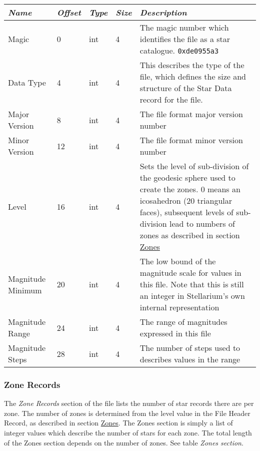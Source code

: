 \begin{longtabu} to \textwidth {l l l l X}\toprule
\emph{Name} & \emph{Offset} & \emph{Type} & \emph{Size} & \emph{Description}\\\midrule
Magic             &  0 & int & 4 & The magic number which identifies the file as a star catalogue. \texttt{0xde0955a3}\\\midrule
Data Type         &  4 & int & 4 & This describes the type of the file, which defines the size and structure of the Star Data record for the file.\\\midrule
Major Version     &  8 & int & 4 & The file format major version number\\\midrule
Minor Version     & 12 & int & 4 & The file format minor version number\\\midrule
Level             & 16 & int & 4 & Sets the level of sub-division of the geodesic sphere used to create the zones. 
                                   0 means an icosahedron (20 triangular faces), 
                                   subsequent levels of sub-division lead to numbers of zones 
                                   as described in section \href{Star_Catalogue\#Zones}{Zones}\\\midrule
Magnitude Minimum & 20 & int & 4 & The low bound of the magnitude scale for values in this file. Note that this is still an integer in Stellarium's own internal representation\\\midrule
Magnitude Range   & 24 & int & 4 & The range of magnitudes expressed in this file\\\midrule
Magnitude Steps   & 28 & int & 4 & The number of steps used to describes values in the range\\\bottomrule
\end{longtabu}

\subsubsection{Zone Records}%
\label{sec:Catalogues:stars:record:zone}

The \emph{Zone Records} section of the file lists the number of star
records there are per zone. The number of zones is determined from the
level value in the File Header Record, as described in section
\href{Star_Catalogue\#Zones}{Zones}. The Zones section is simply a list
of integer values which describe the number of stars for each zone. The
total length of the Zones section depends on the number of zones. See
table \emph{Zones section}.

